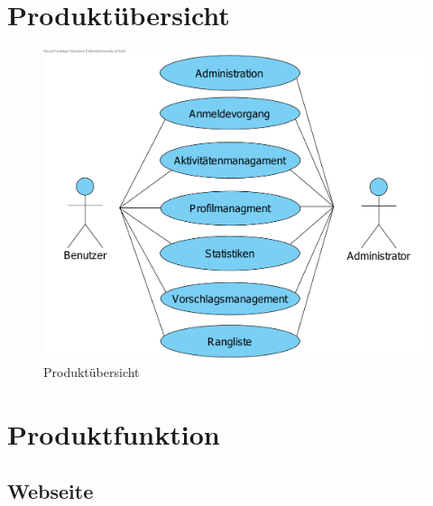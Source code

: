 \documentclass[10pt,a4paper]{article}
\begin{document}



\section{Produkt\"ubersicht}
\begin{figure}[H]
	\centering
	\includegraphics[width=\textwidth]{gfx/Produktuebersicht}
	 \caption{Produkt\"ubersicht}
\end{figure}


\section{Produktfunktion}
\subsection{Webseite}
\end{document}
